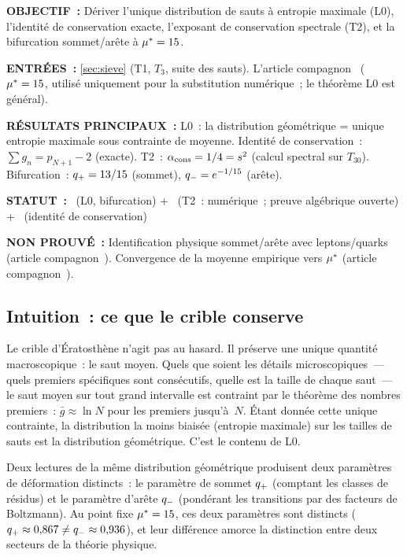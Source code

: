 \documentclass[12pt,a4paper]{article}
\begin{document}
\begin{statusbox}
\textbf{OBJECTIF~:}
  Dériver l'unique distribution de sauts à entropie maximale (L0),
  l'identité de conservation exacte, l'exposant de conservation
  spectrale (T2), et la bifurcation sommet/arête à ${\mu^{*}} = 15$.

\textbf{ENTRÉES~:}
  \cref{sec:sieve} (T1, $T_3$, suite des sauts). L'article
  compagnon~\cite{companion_M3} (${\mu^{*}} = 15$, utilisé uniquement
  pour la substitution numérique~; le théorème L0 est général).

\textbf{RÉSULTATS PRINCIPAUX~:}
  L0~: la distribution géométrique = unique entropie maximale sous
  contrainte de moyenne.
  Identité de conservation~: $\sum g_n = p_{N+1} - 2$ (exacte).
  T2~: $\alpha_{\rm cons} = 1/4 = s^2$ (calcul spectral sur $T_{30}$).
  Bifurcation~: $q_{+} = 13/15$ (sommet),
  $q_{-} = e^{-1/15}$ (arête).

\textbf{STATUT~:}
  \THMTAG~(L0, bifurcation) + \VALTAG~(T2~: numérique~; preuve
  algébrique ouverte) + \IDTAG~(identité de conservation)

\textbf{NON PROUVÉ~:}
  Identification physique sommet/arête avec leptons/quarks (article
  compagnon~\cite{companion_M5}).
  Convergence de la moyenne empirique vers ${\mu^{*}}$ (article
  compagnon~\cite{companion_M3}).
\end{statusbox}

\subsection{Intuition~: ce que le crible conserve}
\label{sec:ch3_intuition}

Le crible d'Ératosthène n'agit pas au hasard. Il préserve une unique
quantité macroscopique~: le saut moyen. Quels que soient les détails
microscopiques~--- quels premiers spécifiques sont consécutifs,
quelle est la taille de chaque saut~--- le saut moyen sur tout grand
intervalle est contraint par le théorème des nombres premiers~:
$\bar g \approx \ln N$ pour les premiers jusqu'à~$N$. Étant donnée
cette unique contrainte, la distribution la moins biaisée (entropie
maximale) sur les tailles de sauts est la distribution géométrique.
C'est le contenu de L0.

Deux lectures de la même distribution géométrique produisent deux
paramètres de déformation distincts~: le paramètre de sommet $q_{+}$
(comptant les classes de résidus) et le paramètre d'arête $q_{-}$
(pondérant les transitions par des facteurs de Boltzmann). Au point
fixe ${\mu^{*}} = 15$, ces deux paramètres sont distincts
($q_{+} \approx 0{,}867 \neq q_{-} \approx 0{,}936$), et leur
différence amorce la distinction entre deux secteurs de la théorie
physique.
\end{document}
